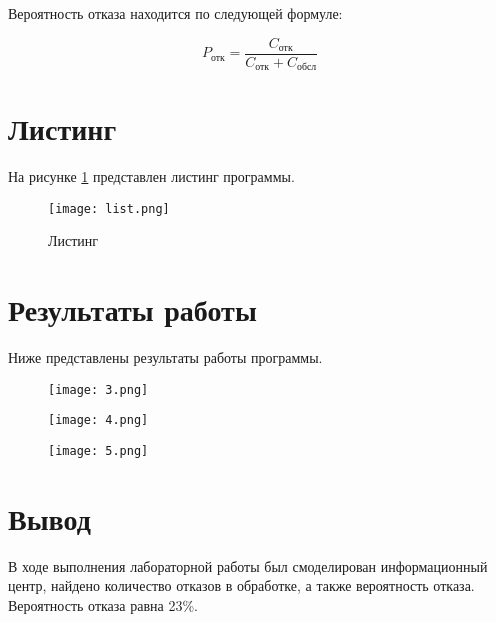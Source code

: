 \documentclass[a4paper,fontsize=12bp]{extreport}
\begin{document}
Вероятность отказа находится по следующей формуле:

$$P_\text{отк} = \frac{C_\text{отк}}{C_\text{отк}+C_\text{обсл}}$$

\section*{Листинг}

На рисунке \ref{fig:l} представлен листинг программы.
\begin{figure}[H]
    \texttt{[image: list.png]}
    \caption{Листинг}
    \label{fig:l}
\end{figure}

\newpage
\section*{Результаты работы}

Ниже представлены результаты работы программы.

\begin{figure}[H]
    \texttt{[image: 3.png]}
    \label{fig:3}
\end{figure}

\begin{figure}[H]
    \texttt{[image: 4.png]}
    \label{fig:4}
\end{figure}

\begin{figure}[H]
    \texttt{[image: 5.png]}
    \label{fig:5}
\end{figure}


\section*{Вывод}
В ходе выполнения лабораторной работы был смоделирован информационный центр, найдено количество отказов в обработке, а также вероятность отказа. Вероятность отказа равна 23\%.
\end{document}
